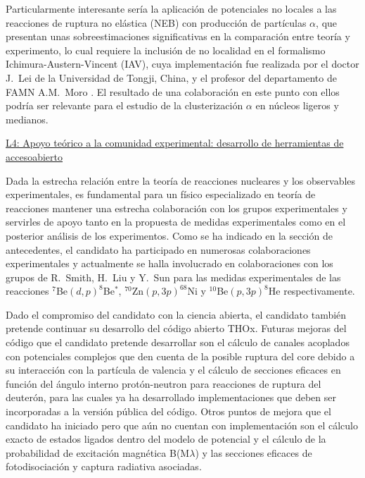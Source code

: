\documentclass[a4paper,12pt,twoside]{article}
\begin{document}
Particularmente interesante sería la aplicación de potenciales no locales a las reacciones de ruptura no elástica (NEB) con producción de partículas $\alpha$, que presentan unas sobreestimaciones significativas en la comparación entre teoría y experimento, lo cual requiere la inclusión de no localidad en el formalismo Ichimura-Austern-Vincent (IAV), cuya implementación fue realizada por el doctor J.~Lei de la Universidad de Tongji, China, y el profesor del departamento de FAMN A.M.~Moro \cite{iav}. El resultado de una colaboración en este punto con ellos podría ser relevante para el estudio de la clusterización $\alpha$ en núcleos ligeros y medianos.

\underline{L4: Apoyo teórico a la comunidad experimental:  desarrollo de herramientas de acceso}\newline \underline{abierto}

Dada la estrecha relación entre la teoría de reacciones nucleares y los observables experimentales, es fundamental para un físico especializado en teoría de reacciones mantener una estrecha colaboración con los grupos experimentales y servirles de apoyo tanto en la propuesta de medidas experimentales como en el posterior análisis de los experimentos. Como se ha indicado en la sección de antecedentes, el candidato ha participado en numerosas colaboraciones experimentales y actualmente se halla involucrado en colaboraciones con los grupos de R.~Smith, H.~Liu y Y.~Sun para las medidas experimentales de las reacciones $^7$Be$(d, p)^8$Be$^*$, $^{70}$Zn$(p,3p)^{68}$Ni y $^{10}$Be$(p,3p)^8$He respectivamente.

Dado el compromiso del candidato con la ciencia abierta, el candidato también pretende continuar su desarrollo del código abierto THOx. Futuras mejoras del código que el candidato pretende desarrollar son el cálculo de canales acoplados con potenciales complejos que den cuenta de la posible ruptura del core debido a su interacción con la partícula de valencia \cite{complexcdcc} y el cálculo de secciones eficaces en función del ángulo interno protón-neutron para reacciones de ruptura del deuterón, para las cuales ya ha desarrollado implementaciones que deben ser incorporadas a la versión pública del código. Otros puntos de mejora que el candidato ha iniciado pero que aún no cuentan con implementación son el cálculo exacto de estados ligados dentro del modelo de potencial y el cálculo de la probabilidad de excitación magnética B(M$\lambda$) y las secciones eficaces de fotodisociación y captura radiativa asociadas.
\end{document}
